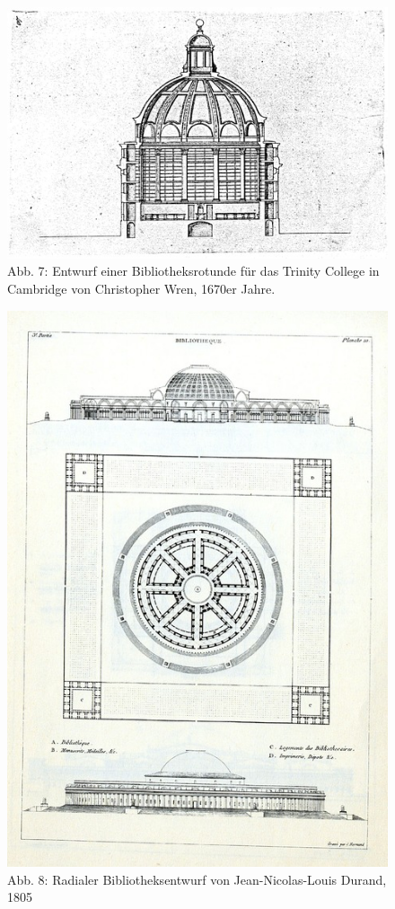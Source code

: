 \begin{figure}[htbp]
\centering
\includegraphics{img/wagner-7.jpg}
\caption*{Abb. 7: Entwurf einer Bibliotheksrotunde für das Trinity
College in Cambridge von Christopher Wren, 1670er Jahre.}
\end{figure}

\begin{figure}[htbp]
\centering
\includegraphics{img/wagner-8.jpg}
\caption*{Abb. 8: Radialer Bibliotheksentwurf von Jean-Nicolas-Louis
Durand, 1805}
\end{figure}

